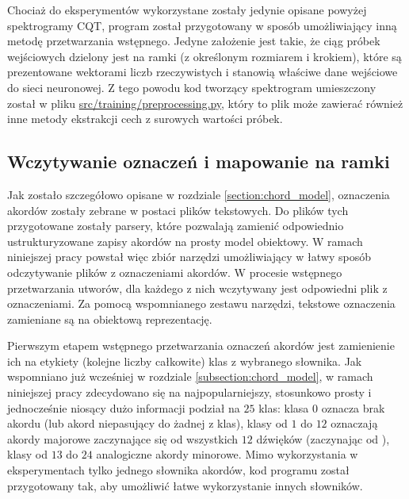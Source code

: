 Chociaż do eksperymentów wykorzystane zostały jedynie opisane powyżej spektrogramy CQT, program został przygotowany w sposób umożliwiający inną metodę przetwarzania wstępnego. Jedyne założenie jest takie, że ciąg próbek wejściowych dzielony jest na ramki (z określonym rozmiarem i krokiem), które są prezentowane wektorami liczb rzeczywistych i stanowią właściwe dane wejściowe do sieci neuronowej. Z tego powodu kod tworzący spektrogram umieszczony został w pliku \url{src/training/preprocessing.py}, który to plik może zawierać również inne metody ekstrakcji cech z surowych wartości próbek.

\subsection{Wczytywanie oznaczeń i mapowanie na ramki}

Jak zostało szczegółowo opisane w rozdziale \ref{section:chord_model}, oznaczenia akordów zostały zebrane w postaci plików tekstowych. Do plików tych przygotowane zostały parsery, które pozwalają zamienić odpowiednio ustrukturyzowane zapisy akordów na prosty model obiektowy. W ramach niniejszej pracy powstał więc zbiór narzędzi umożliwiający w łatwy sposób odczytywanie plików z oznaczeniami akordów.  W procesie wstępnego przetwarzania utworów, dla każdego z nich wczytywany jest odpowiedni plik z oznaczeniami. Za pomocą wspomnianego zestawu narzędzi, tekstowe oznaczenia zamieniane są na obiektową reprezentację.

Pierwszym etapem wstępnego przetwarzania oznaczeń akordów jest zamienienie ich na etykiety (kolejne liczby całkowite) klas z wybranego słownika. Jak wspomniano już wcześniej w rozdziale \ref{subsection:chord_model}, w ramach niniejszej pracy zdecydowano się na najpopularniejszy, stosunkowo prosty i jednocześnie niosący dużo informacji podział na $25$ klas: klasa $0$ oznacza brak akordu (lub akord niepasujący do żadnej z klas), klasy od $1$ do $12$ oznaczają akordy majorowe zaczynające się od wszystkich $12$ dźwięków (zaczynając od ), klasy od $13$ do $24$ analogiczne akordy minorowe. Mimo wykorzystania w eksperymentach tylko jednego słownika akordów, kod programu został przygotowany tak, aby umożliwić łatwe wykorzystanie innych słowników.

